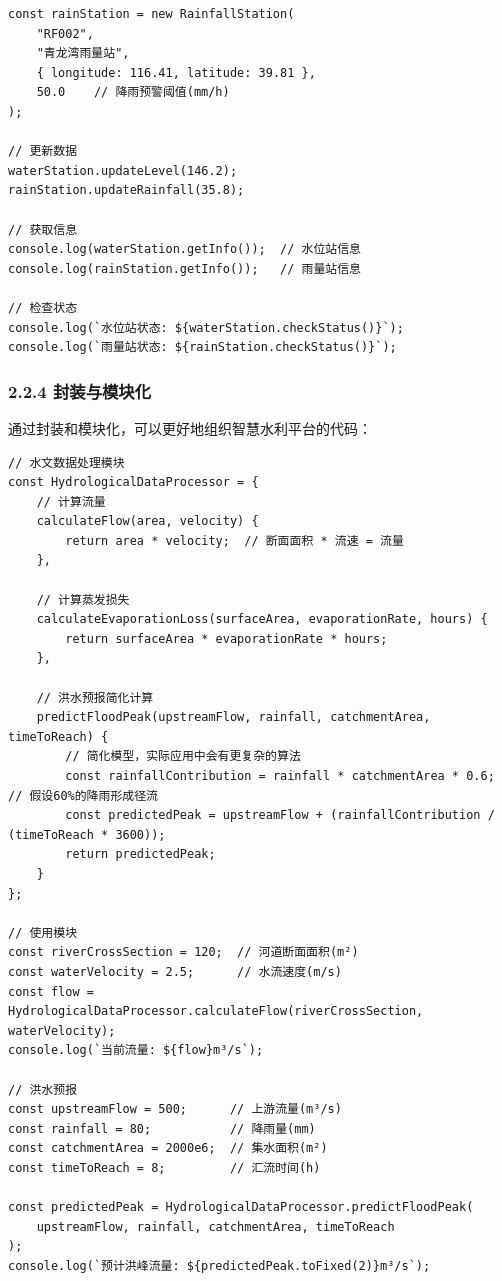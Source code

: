 \begin{lstlisting}
const rainStation = new RainfallStation(
    "RF002",
    "青龙湾雨量站",
    { longitude: 116.41, latitude: 39.81 },
    50.0    // 降雨预警阈值(mm/h)
);

// 更新数据
waterStation.updateLevel(146.2);
rainStation.updateRainfall(35.8);

// 获取信息
console.log(waterStation.getInfo());  // 水位站信息
console.log(rainStation.getInfo());   // 雨量站信息

// 检查状态
console.log(`水位站状态: ${waterStation.checkStatus()}`);
console.log(`雨量站状态: ${rainStation.checkStatus()}`);
\end{lstlisting}

\subsubsection{2.2.4
封装与模块化}\label{ux5c01ux88c5ux4e0eux6a21ux5757ux5316}

通过封装和模块化，可以更好地组织智慧水利平台的代码：

\begin{lstlisting}
// 水文数据处理模块
const HydrologicalDataProcessor = {
    // 计算流量
    calculateFlow(area, velocity) {
        return area * velocity;  // 断面面积 * 流速 = 流量
    },
    
    // 计算蒸发损失
    calculateEvaporationLoss(surfaceArea, evaporationRate, hours) {
        return surfaceArea * evaporationRate * hours;
    },
    
    // 洪水预报简化计算
    predictFloodPeak(upstreamFlow, rainfall, catchmentArea, timeToReach) {
        // 简化模型，实际应用中会有更复杂的算法
        const rainfallContribution = rainfall * catchmentArea * 0.6;  // 假设60%的降雨形成径流
        const predictedPeak = upstreamFlow + (rainfallContribution / (timeToReach * 3600));
        return predictedPeak;
    }
};

// 使用模块
const riverCrossSection = 120;  // 河道断面面积(m²)
const waterVelocity = 2.5;      // 水流速度(m/s)
const flow = HydrologicalDataProcessor.calculateFlow(riverCrossSection, waterVelocity);
console.log(`当前流量: ${flow}m³/s`);

// 洪水预报
const upstreamFlow = 500;      // 上游流量(m³/s)
const rainfall = 80;           // 降雨量(mm)
const catchmentArea = 2000e6;  // 集水面积(m²)
const timeToReach = 8;         // 汇流时间(h)

const predictedPeak = HydrologicalDataProcessor.predictFloodPeak(
    upstreamFlow, rainfall, catchmentArea, timeToReach
);
console.log(`预计洪峰流量: ${predictedPeak.toFixed(2)}m³/s`);
\end{lstlisting}

